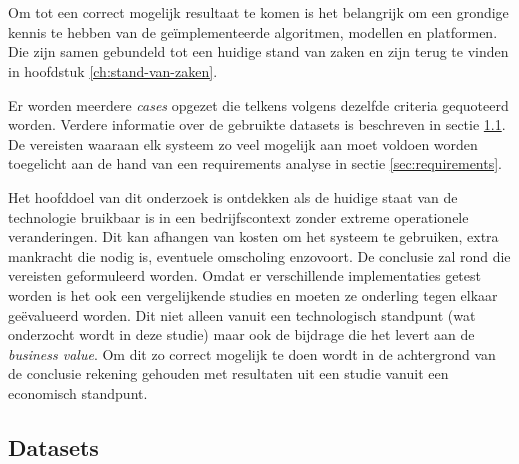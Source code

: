 
\chapter{}
\label{ch:methodologie}


Om tot een correct mogelijk resultaat te komen is het belangrijk om een grondige kennis te hebben van de geïmplementeerde algoritmen, modellen en platformen. Die zijn samen gebundeld tot een huidige stand van zaken en zijn terug te vinden in hoofdstuk \ref{ch:stand-van-zaken}.

Er worden meerdere \textit{cases} opgezet die telkens volgens dezelfde criteria gequoteerd worden. Verdere informatie over de gebruikte datasets is beschreven in sectie \ref{sec:datasets}. De vereisten waaraan elk systeem zo veel mogelijk aan moet voldoen worden toegelicht aan de hand van een requirements analyse in sectie \ref{sec:requirements}.

Het hoofddoel van dit onderzoek is ontdekken als de huidige staat van de technologie bruikbaar is in een bedrijfscontext zonder extreme operationele veranderingen. Dit kan afhangen van kosten om het systeem te gebruiken, extra mankracht die nodig is, eventuele omscholing enzovoort. De conclusie zal rond die vereisten geformuleerd worden. Omdat er verschillende implementaties getest worden is het ook een vergelijkende studies en moeten ze onderling tegen elkaar geëvalueerd worden. Dit niet alleen vanuit een technologisch standpunt (wat onderzocht wordt in deze studie) maar ook de bijdrage die het levert aan de \textit{business value}. Om dit zo correct mogelijk te doen wordt in de achtergrond van de conclusie rekening gehouden met resultaten uit een studie vanuit een economisch standpunt. 

\section{Datasets}
\label{sec:datasets}

